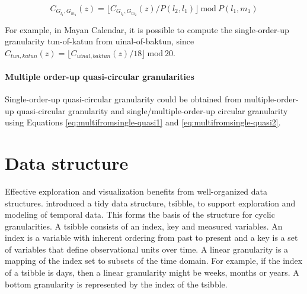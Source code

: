\documentclass[12pt]{article}
\begin{document}
\begin{equation} \label{eq:all-circular-multiple}
C_{G_{l_1}, G_{m_1}}(z) = \lfloor C_{G_{l_2}, G_{m_2}}(z)/P(l_2,l_1) \rfloor ~\text{mod}~P(l_1, m_1)
\end{equation}

\noindent For example, in Mayan Calendar, it is possible to compute the single-order-up granularity tun-of-katun from uinal-of-baktun, since \(C_{tun, katun}(z) = \lfloor C_{uinal, baktun}(z)/18\rfloor ~\text{mod}~20\).

\hypertarget{sec:quasi-circular-multiple}{%
\paragraph{Multiple order-up quasi-circular granularities}\label{sec:quasi-circular-multiple}}

Single-order-up quasi-circular granularity could be obtained from multiple-order-up quasi-circular granularity and single/multiple-order-up circular granularity using Equations \ref{eq:multifromsingle-quasi1} and \ref{eq:multifromsingle-quasi2}.

\hypertarget{sec:data-structure}{%
\section{Data structure}\label{sec:data-structure}}

\noindent Effective exploration and visualization benefits from well-organized data structures. \citet{wang2020tsibble} introduced a tidy data structure, tsibble, to support exploration and modeling of temporal data. This forms the basis of the structure for cyclic granularities. A tsibble consists of an index, key and measured variables. An index is a variable with inherent ordering from past to present and a key is a set of variables that define observational units over time. A linear granularity is a mapping of the index set to subsets of the time domain. For example, if the index of a tsibble is days, then a linear granularity might be weeks, months or years. A bottom granularity is represented by the index of the tsibble.
\end{document}
